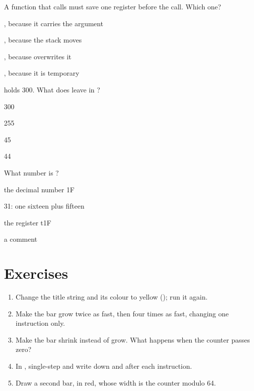 \begin{quiz}{A function that calls  must save one register before the call. Which one?}
\item {}, because it carries the argument
\item {}, because the stack moves
\item {}, because  overwrites it
\item {}, because it is temporary
\end{quiz}

\begin{quiz}{ holds 300. What does  leave in ?}
\item 300
\item 255
\item 45
\item 44
\end{quiz}

\begin{quiz}{What number is ?}
\item the decimal number 1F
\item 31: one sixteen plus fifteen
\item the register t1F
\item a comment
\end{quiz}

\section{Exercises}

\begin{exercise}[on \prg]
\begin{enumerate}[nosep]
\item Change the title string and its colour to yellow (); run it again.
\item Make the bar grow twice as fast, then four times as fast, changing one
  instruction only.
\item Make the bar shrink instead of grow. What happens when the counter
  passes zero?
\item In \prgqt, single-step  and write down  and
   after each instruction.
\item Draw a second bar, in red, whose width is the counter modulo 64.
\end{enumerate}
\end{exercise}

